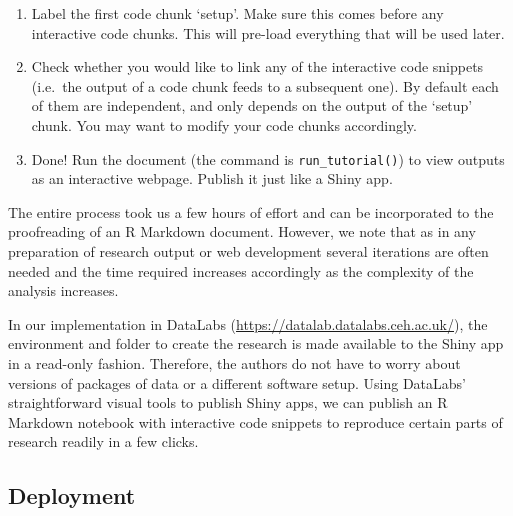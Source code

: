 


\begin{enumerate}
\def\labelenumi{\arabic{enumi}.}
\setcounter{enumi}{3}
\tightlist
\item
  Label the first code chunk `setup'. Make sure this comes before any
  interactive code chunks. This will pre-load everything that will be
  used later.
\item
  Check whether you would like to link any of the interactive code
  snippets (i.e.~the output of a code chunk feeds to a subsequent one).
  By default each of them are independent, and only depends on the
  output of the `setup' chunk. You may want to modify your code chunks
  accordingly.
\item
  Done! Run the document (the command is \texttt{run\_tutorial()}) to
  view outputs as an interactive webpage. Publish it just like a Shiny
  app.
\end{enumerate}

The entire process took us a few hours of effort and can be incorporated
to the proofreading of an R Markdown document. However, we note that as
in any preparation of research output or web development several
iterations are often needed and the time required increases accordingly
as the complexity of the analysis increases.

In our implementation in DataLabs
(\url{https://datalab.datalabs.ceh.ac.uk/}), the environment and folder
to create the research is made available to the Shiny app in a read-only
fashion. Therefore, the authors do not have to worry about versions of
packages of data or a different software setup. Using DataLabs'
straightforward visual tools to publish Shiny apps, we can publish an R
Markdown notebook with interactive code snippets to reproduce certain
parts of research readily in a few clicks.

\hypertarget{deployment}{%
\subsection{Deployment}\label{deployment}}

